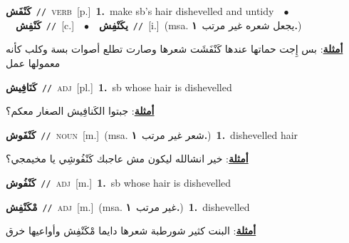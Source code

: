\documentclass[10pt,a4paper,twoside]{article} %
\begin{document}
\begin{multicols}{2}
{\setlength\topsep{0pt}\textbf{\foreignlanguage{arabic}{كَنْفَش}}\ {\color{gray}\texttt{//}\color{black}}\ \textsc{verb}\ [p.]\ \textbf{1.}~make sb's hair dishevelled and untidy\ \ $\bullet$\ \ \setlength\topsep{0pt}\textbf{\foreignlanguage{arabic}{كَنْفِش}}\ {\color{gray}\texttt{//}\color{black}}\ [c.]\ \ $\bullet$\ \ \setlength\topsep{0pt}\textbf{\foreignlanguage{arabic}{يكَنْفِش}}\ {\color{gray}\texttt{//}\color{black}}\ [i.]\ \color{gray}(msa. \foreignlanguage{arabic}{يجعل شعره غير مرتب}~\foreignlanguage{arabic}{\textbf{١.}})\color{black}\  \begin{flushright}\color{gray}\foreignlanguage{arabic}{\textbf{\underline{\foreignlanguage{arabic}{أمثلة}}}: بس إِجت حماتها عندها كَنْفَشَت شعرها وصارت تطلع أصوات بسة وكلب كأنه معمولها عمل}\end{flushright}\color{black}} \vspace{2mm}

{\setlength\topsep{0pt}\textbf{\foreignlanguage{arabic}{كَنَافِيش}}\ {\color{gray}\texttt{//}\color{black}}\ \textsc{adj}\ [pl.]\ \textbf{1.}~sb whose hair is dishevelled\  \begin{flushright}\color{gray}\foreignlanguage{arabic}{\textbf{\underline{\foreignlanguage{arabic}{أمثلة}}}: جبتوا الكَنافِيش الصغار معكم؟}\end{flushright}\color{black}} \vspace{2mm}

{\setlength\topsep{0pt}\textbf{\foreignlanguage{arabic}{كَنْفَوش}}\ {\color{gray}\texttt{//}\color{black}}\ \textsc{noun}\ [m.]\ \color{gray}(msa. \foreignlanguage{arabic}{شعر غير مرتب}~\foreignlanguage{arabic}{\textbf{١.}})\color{black}\ \textbf{1.}~dishevelled hair\  \begin{flushright}\color{gray}\foreignlanguage{arabic}{\textbf{\underline{\foreignlanguage{arabic}{أمثلة}}}: خير انشالله ليكون مش عاجبك كَنْفُوشِي يا مخيمجي؟}\end{flushright}\color{black}} \vspace{2mm}

{\setlength\topsep{0pt}\textbf{\foreignlanguage{arabic}{كَنْفُوش}}\ {\color{gray}\texttt{//}\color{black}}\ \textsc{adj}\ [m.]\ \textbf{1.}~sb whose hair is dishevelled\ } \vspace{2mm}

{\setlength\topsep{0pt}\textbf{\foreignlanguage{arabic}{مْكَنْفِش}}\ {\color{gray}\texttt{//}\color{black}}\ \textsc{adj}\ [m.]\ \color{gray}(msa. \foreignlanguage{arabic}{غير مرتب}~\foreignlanguage{arabic}{\textbf{١.}})\color{black}\ \textbf{1.}~dishevelled\  \begin{flushright}\color{gray}\foreignlanguage{arabic}{\textbf{\underline{\foreignlanguage{arabic}{أمثلة}}}: البنت كثير شورطبة شعرها دايما مْكَنْفِش وأواعيها خرق}\end{flushright}\color{black}} \vspace{2mm}


\end{multicols}
\end{document}
